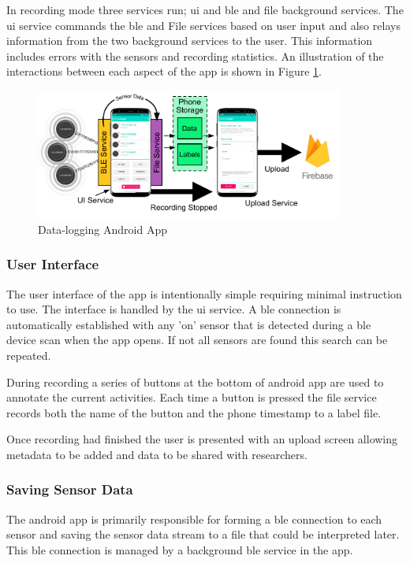 In recording mode three services run; \acrfull{ui} and \acrshort{ble} and file background services. The \acrshort{ui} service commands the \acrshort{ble} and File services based on user input and also relays information from the two background services to the user. This information includes errors with the sensors and recording statistics. An illustration of the interactions between each aspect of the app is shown in Figure \ref{fig:methods-android-app}.

\begin{figure}[!hbt]
    \centering
    \includegraphics[width=0.9\textwidth]{content/3-Methods/Android_App.pdf}
    \caption{Data-logging Android App}
    \label{fig:methods-android-app}
\end{figure}

\subsubsection{User Interface}
The user interface of the app is intentionally simple requiring minimal instruction to use. The interface is handled by the \acrshort{ui} service. A \acrshort{ble} connection is automatically established with any 'on' sensor that is detected during a \acrshort{ble} device scan when the app opens. If not all sensors are found this search can be repeated.

During recording a series of buttons at the bottom of android app are used to annotate the current activities. Each time a button is pressed the file service records both the name of the button and the phone timestamp to a label file.

Once recording had finished the user is presented with an upload screen allowing metadata to be added and data to be shared with researchers.

\subsubsection{Saving Sensor Data}
The android app is primarily responsible for forming a \acrshort{ble} connection to each sensor and saving the sensor data stream to a file that could be interpreted later. This \acrshort{ble} connection is managed by a background \acrshort{ble} service in the app.


